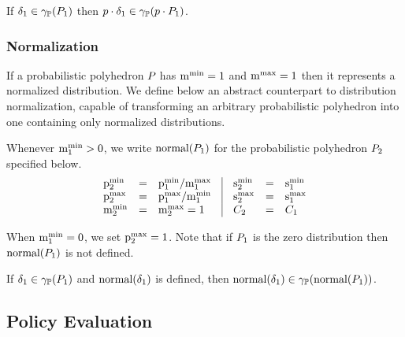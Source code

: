 \begin{lemma}
\label{lem:pp:scalar-prod}
If $\delta_1 \in \gamma_{\mathbb{P}}(P_{1})$ then $p \cdot \delta_1 \in \gamma_{\mathbb{P}}(p \cdot P_{1})$.
\end{lemma}

\subsubsection{Normalization}

If a probabilistic polyhedron $P_{}$ has $\mathrm{m}^\mathrm{min}_{} = 1$ and $\mathrm{m}^\mathrm{max}_{} =
1$ then it represents a normalized distribution.  We define below an
abstract counterpart to distribution normalization, capable of
transforming an arbitrary probabilistic polyhedron into one containing
only normalized distributions.

\begin{definition}
Whenever $ \mathrm{m}^\mathrm{min}_{1} > 0 $, we write $\text{normal}(P_{1})$ for the probabilistic polyhedron $P_{2}$
specified below.
\[
\begin{array}{lcl@{\hspace{0.35cm}}|@{\hspace{0.35cm}}lcl}
\pmin{2} &=& \pmin{1} / \mmax{1} &
\smin{2} &=& \smin{1}\\
\pmax{2} &=& \pmax{1} / \mmin{1} &
\smax{2} &=&\smax{1} \\
\mmin{2} &=& \mmax{2} = 1 & \getpoly{2} &=& \getpoly{1} \\
\end{array}
\]
\end{definition}

When $ \mathrm{m}^\mathrm{min}_{1} = 0 $, we set $\mathrm{p}^\mathrm{max}_{2} = 1$.  Note that if $P_{1}$
is the zero distribution then $\text{normal}(P_{1})$ is not defined.


\begin{lemma}
\label{lem:pp:norm}
If $\delta_1 \in \gamma_{\mathbb{P}}(P_{1})$ and $\text{normal}(\delta_1)$ is defined, then $\text{normal}(\delta_1) \in \gamma_{\mathbb{P}}(\text{normal}(P_{1}))$.
\end{lemma}

\subsection{Policy Evaluation}

